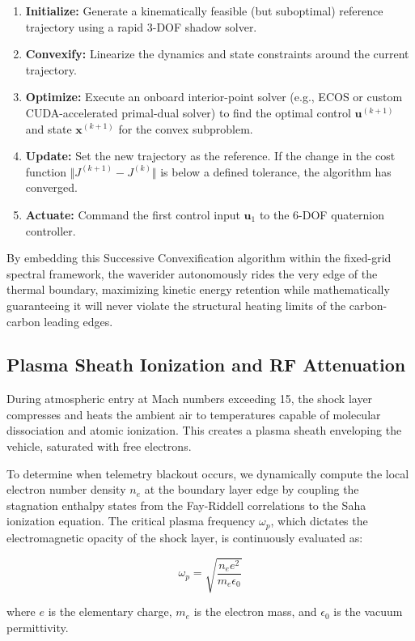 \documentclass[11pt,a4paper]{article}
\theoremstyle{definition}
\numberwithin{equation}{section}
\begin{document}
\begin{enumerate}
    \item \textbf{Initialize:} Generate a kinematically feasible (but suboptimal) reference trajectory using a rapid 3-DOF shadow solver.
    \item \textbf{Convexify:} Linearize the dynamics and state constraints around the current trajectory.
    \item \textbf{Optimize:} Execute an onboard interior-point solver (e.g., ECOS or custom CUDA-accelerated primal-dual solver) to find the optimal control $\mathbf{u}^{(k+1)}$ and state $\mathbf{x}^{(k+1)}$ for the convex subproblem.
    \item \textbf{Update:} Set the new trajectory as the reference. If the change in the cost function $\Vert J^{(k+1)} - J^{(k)} \Vert$ is below a defined tolerance, the algorithm has converged.
    \item \textbf{Actuate:} Command the first control input $\mathbf{u}_1$ to the 6-DOF quaternion controller.
\end{enumerate}

By embedding this Successive Convexification algorithm within the fixed-grid spectral framework, the waverider autonomously rides the very edge of the thermal boundary, maximizing kinetic energy retention while mathematically guaranteeing it will never violate the structural heating limits of the carbon-carbon leading edges.

\subsection{Plasma Sheath Ionization and RF Attenuation}

During atmospheric entry at Mach numbers exceeding 15, the shock layer compresses and heats the ambient air to temperatures capable of molecular dissociation and atomic ionization. This creates a plasma sheath enveloping the vehicle, saturated with free electrons.

To determine when telemetry blackout occurs, we dynamically compute the local electron number density $n_e$ at the boundary layer edge by coupling the stagnation enthalpy states from the Fay-Riddell correlations to the Saha ionization equation. The critical plasma frequency $\omega_p$, which dictates the electromagnetic opacity of the shock layer, is continuously evaluated as:

$$\omega_p = \sqrt{\frac{n_e e^2}{m_e \epsilon_0}}$$

where $e$ is the elementary charge, $m_e$ is the electron mass, and $\epsilon_0$ is the vacuum permittivity.
\end{document}
